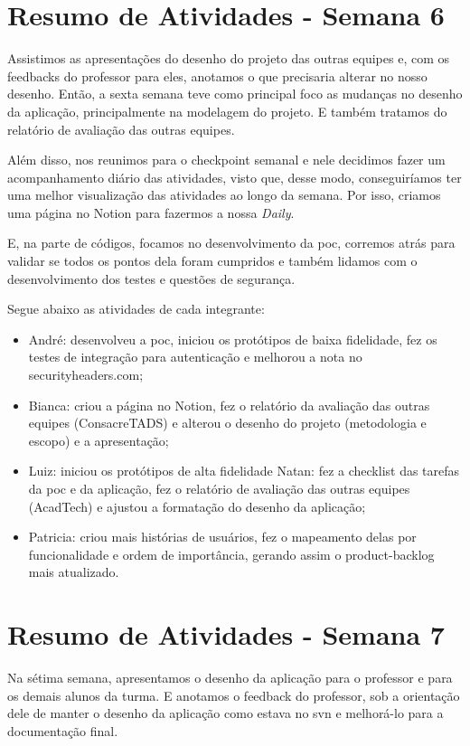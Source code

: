 \documentclass[
    12pt,               %
    openright,          %
    oneside,
    a4paper,            %
    english,            %
    brazil              %
    ]{ifsp-spo-inf-ctds} %
\begin{document}
\begin{apendicesenv}
\section{Resumo de Atividades - Semana 6}
Assistimos as apresentações do desenho do projeto das outras equipes e, com os \glspl{feedback} do professor para eles, anotamos o que precisaria alterar no nosso desenho. Então, a sexta semana teve como principal foco as mudanças no desenho da aplicação, principalmente na modelagem do projeto. E também tratamos do relatório de avaliação das outras equipes.

Além disso, nos reunimos para o \gls{checkpoint} semanal e nele decidimos fazer um acompanhamento diário das atividades, visto que, desse modo, conseguiríamos ter uma melhor visualização das atividades ao longo da semana. Por isso, criamos uma página no Notion para fazermos a nossa \textit{Daily}.

E, na parte de códigos, focamos no desenvolvimento da \ac{poc}, corremos atrás para validar se todos os pontos dela foram cumpridos e também lidamos com o desenvolvimento dos testes e questões de segurança.

Segue abaixo as atividades de cada integrante:

\begin{itemize}
\item André: desenvolveu a \ac{poc}, iniciou os protótipos de baixa fidelidade, fez os testes de integração para autenticação e melhorou a nota no securityheaders.com;
\item Bianca: criou a página no Notion, fez o relatório da avaliação das outras equipes (ConsacreTADS) e alterou o desenho do projeto (metodologia e escopo) e a apresentação;
\item Luiz: iniciou os protótipos de alta fidelidade
Natan: fez a \gls{checklist} das tarefas da \ac{poc} e da aplicação, fez o relatório de avaliação das outras equipes (AcadTech) e ajustou a formatação do desenho da aplicação;
\item Patricia: criou mais histórias de usuários, fez o mapeamento delas por funcionalidade e ordem de importância, gerando assim o \gls{product-backlog} mais atualizado.
\end{itemize}

\section{Resumo de Atividades - Semana 7}
Na sétima semana, apresentamos o desenho da aplicação para o professor e para os demais alunos da turma. E anotamos o feedback do professor, sob a orientação dele de manter o desenho da aplicação como estava no \ac{svn} e melhorá-lo para a documentação final.


\end{apendicesenv}
\end{document}

